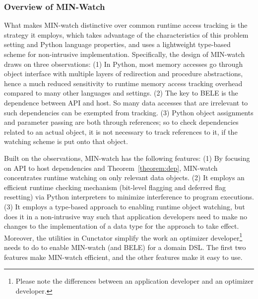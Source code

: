 \documentclass[sigconf]{acmart}\settopmatter{printfolios=true,printccs=false,printacmref=false}\setcopyright{none}
\begin{document}
\subsubsection{Overview of MIN-Watch}
\label{sec:overviewWatch}

What makes MIN-watch distinctive over common runtime access tracking is the strategy it employs, which takes advantage of the characteristics of this problem setting and Python language properties, and uses a lightweight type-based scheme for non-intrusive implementation. Specifically, the design of MIN-watch draws on three observations: (1) In Python, most memory accesses go through object interface with multiple layers of redirection and procedure abstractions, hence a much reduced sensitivity to runtime memory access tracking overhead compared to many other languages and settings. (2) The key to BELE is the dependence between API and host. So many data accesses that are irrelevant to such dependencies can be exempted from tracking. (3) Python object assignments and parameter passing are both through references; so to check dependencies related to an actual object, it is not necessary to track references to it, if the watching scheme is put onto that object. 

Built on the observations, MIN-watch has the following features: (1) By focusing on API to host dependencies and Theorem~\ref{theorem:dep}, MIN-watch concentrates runtime watching on only relevant data objects. (2) It employs an efficient runtime checking mechanism (bit-level flagging and deferred flag resetting) via Python interpreters to minimize interference to program executions. (3) It employs a type-based approach to enabling runtime object watching, but does it in a non-intrusive way such that application developers need to make no changes to the implementation of a data type for the approach to take effect. Moreover, the utilities in Cunctator simplify the work an optimizer developer\footnote{Please note the differences between an application developer and an optimizer developer.}
needs to do to enable MIN-watch (and BELE) for a domain DSL. The first two features make MIN-watch efficient, and the other features make it easy to use. 


\end{document}
